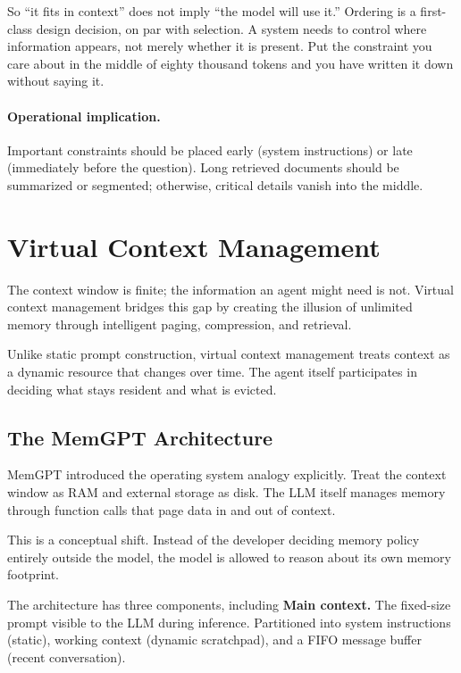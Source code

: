 So ``it fits in context'' does not imply ``the model will use it.'' Ordering is a
first-class design decision, on par with selection. A system needs to control
where information appears, not merely whether it is present. Put the constraint
you care about in the middle of eighty thousand tokens and you have written it
down without saying it.

\paragraph{Operational implication.}
Important constraints should be placed early (system instructions) or late (immediately before the question). Long retrieved documents should be summarized or segmented; otherwise, critical details vanish into the middle.

\section{Virtual Context Management}

The context window is finite; the information an agent might need is not. Virtual context management bridges this gap by creating the illusion of unlimited memory through intelligent paging, compression, and retrieval.

Unlike static prompt construction, virtual context management treats context as a dynamic resource that changes over time. The agent itself participates in deciding what stays resident and what is evicted.

\subsection{The MemGPT Architecture}

MemGPT \cite{packer2024memgpt} introduced the operating system analogy explicitly. Treat the context window as RAM and external storage as disk. The LLM itself manages memory through function calls that page data in and out of context.

This is a conceptual shift. Instead of the developer deciding memory policy entirely outside the model, the model is allowed to reason about its own memory footprint.

The architecture has three components, including \textbf{Main context.} The fixed-size prompt visible to the LLM during inference. Partitioned into system instructions (static), working context (dynamic scratchpad), and a FIFO message buffer (recent conversation).

